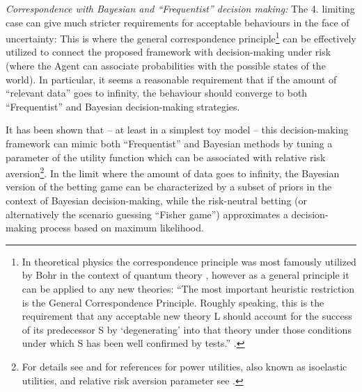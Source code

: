 \documentclass{article}
\begin{document}
{\it Correspondence with Bayesian and ``Frequentist'' decision making:}
The 4. limiting case can give much stricter requirements for acceptable behaviours in the face of uncertainty:
This is where the general correspondence principle\footnote{In theoretical physics the correspondence principle was most famously utilized by Bohr in the context of quantum theory \cite{sep:Correspondence,book:BohrCorrespondence}, however as a general principle it can be applied to any new theories: ``The most important heuristic restriction is the General Correspondence Principle. Roughly speaking, this is the requirement that any acceptable new theory L should account for the success of its predecessor S by ‘degenerating’ into that theory under those conditions under which S has been well confirmed by tests.'' \cite{book:CorrespondencePost}.} can be effectively utilized to connect the proposed framework with decision-making under risk (where the Agent can associate probabilities with the possible states of the world).
In particular, it seems a reasonable requirement that if the amount of ``relevant data'' goes to infinity, the behaviour should converge to both ``Frequentist'' and Bayesian decision-making strategies.

It has been shown that -- at least in a simplest toy model -- this decision-making framework can mimic both ``Frequentist'' and Bayesian methods by tuning a parameter of the utility function which can be associated with relative risk aversion\footnote{For details see \cite{arxiv:konczer2024statisticalgames} and for references for power utilities, also known as isoelastic utilities, and relative risk aversion parameter see \cite{book:EconomicsDictionary,book:Arrow, paper:Pratt}.}.
In the limit where the amount of data goes to infinity, the Bayesian version of the betting game can be characterized by a subset of priors in the context of Bayesian decision-making, while the risk-neutral betting (or alternatively the scenario guessing ``Fisher game'') approximates a decision-making process based on maximum likelihood.
\end{document}
